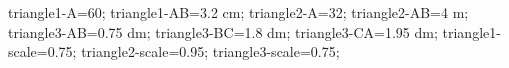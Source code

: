 \documentclass[exercice]{thedocument}%
\begin{document}
%
\>triangle1-A=60;%
\>triangle1-AB=3.2 cm;%
\>triangle2-A=32;%
\>triangle2-AB=4 m;%
\>triangle3-AB=0.75 dm;%
\>triangle3-BC=1.8 dm;%
\>triangle3-CA=1.95 dm;%
\>triangle1-scale=0.75;%
\>triangle2-scale=0.95;%
\>triangle3-scale=0.75;%
%
\end{document}

